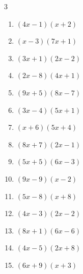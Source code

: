 \begin{multicols}{3}
\begin{enumerate}
  \item $(4x-1)(x+2)$


  \item $(x-3)(7x+1)$


  \item $(3x+1)(2x-2)$


\columnbreak %

  \item $(2x-8)(4x+1)$


  \item $(9x+5)(8x-7)$


  \item $(3x-4)(5x+1)$


  \item $(x+6)(5x+4)$


  \item $(8x+7)(2x-1)$


  \item $(5x+5)(6x-3)$


  \item $(9x-9)(x-2)$


  \item $(5x-8)(x+8)$


  \item $(4x-3)(2x-2)$


  \item $(8x+1)(6x-6)$


  \item $(4x-5)(2x+8)$


  \item $(6x+9)(x+3)$


\end{enumerate}
\end{multicols}
